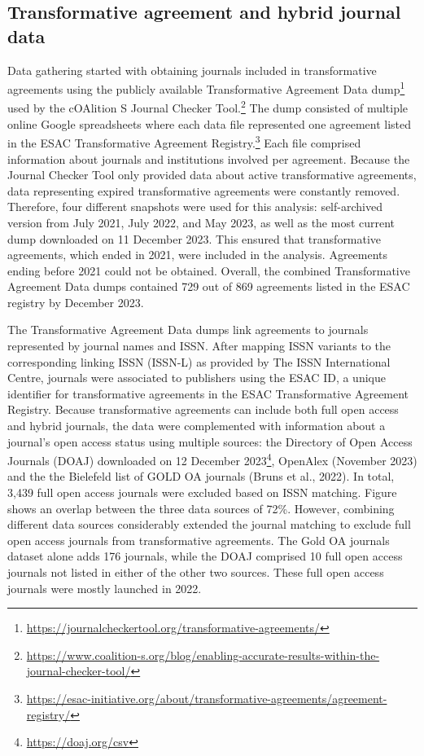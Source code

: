 \documentclass[a4paper,man,floatsintext,longtable,noextraspace,12pt]{apa6}
\begin{document}
\hypertarget{transformative-agreement-and-hybrid-journal-data}{%
\subsection{Transformative agreement and hybrid journal
data}\label{transformative-agreement-and-hybrid-journal-data}}

Data gathering started with obtaining journals included in
transformative agreements using the publicly available Transformative
Agreement Data dump\footnote{\url{https://journalcheckertool.org/transformative-agreements/}}
used by the cOAlition S Journal Checker Tool.\footnote{\url{https://www.coalition-s.org/blog/enabling-accurate-results-within-the-journal-checker-tool/}}
The dump consisted of multiple online Google spreadsheets where each
data file represented one agreement listed in the ESAC Transformative
Agreement Registry.\footnote{\url{https://esac-initiative.org/about/transformative-agreements/agreement-registry/}}
Each file comprised information about journals and institutions involved
per agreement. Because the Journal Checker Tool only provided data about
active transformative agreements, data representing expired
transformative agreements were constantly removed. Therefore, four
different snapshots were used for this analysis: self-archived version
from July 2021, July 2022, and May 2023, as well as the most current
dump downloaded on 11 December 2023. This ensured that transformative
agreements, which ended in 2021, were included in the analysis.
Agreements ending before 2021 could not be obtained. Overall, the
combined Transformative Agreement Data dumps contained 729 out of 869
agreements listed in the ESAC registry by December 2023.

The Transformative Agreement Data dumps link agreements to journals
represented by journal names and ISSN. After mapping ISSN variants to
the corresponding linking ISSN (ISSN-L) as provided by The ISSN
International Centre, journals were associated to publishers using the
ESAC ID, a unique identifier for transformative agreements in the ESAC
Transformative Agreement Registry. Because transformative agreements can
include both full open access and hybrid journals, the data were
complemented with information about a journal's open access status using
multiple sources: the Directory of Open Access Journals (DOAJ)
downloaded on 12 December 2023\footnote{\url{https://doaj.org/csv}},
OpenAlex (November 2023) and the the Bielefeld list of GOLD OA journals
(Bruns et al., 2022). In total, 3,439 full open access journals were
excluded based on ISSN matching. Figure shows an overlap between the
three data sources of 72\%. However, combining different data sources
considerably extended the journal matching to exclude full open access
journals from transformative agreements. The Gold OA journals dataset
alone adds 176 journals, while the DOAJ comprised 10 full open access
journals not listed in either of the other two sources. These full open
access journals were mostly launched in 2022.
\end{document}
